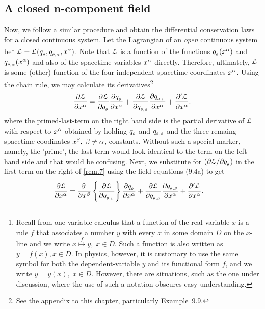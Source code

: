\subsection{A closed n-component field}
Now, we follow a similar procedure and obtain the 
  differential conservation laws for a closed continuous 
  system. Let the Lagrangian of an \textsl{open} 
continuous system  be\footnote{Recall from one-variable 
calculus that a function of the real variable $x$ is a rule 
$f$ that associates a number $y$ with every $x$ in some 
domain $D$ on the $x$-line and we write  
$x\overset{f}{\mapsto}y,\; x\in D$. Such a function is also 
written as $y=f(x),  x\in D$. In physics, however, it is 
customary to use the same symbol for both the 
dependent-variable $y$ and its functional form $f$, and we 
write $y=y(x), \; x\in D$. However, there are situations, 
such as the one under discussion, where the use of such a 
notation obscures easy understanding.} 
$\EuScript{L}=\EuScript{L}(q_{_{{\theta}}} ,q_{_{{\theta},{{\alpha}}}},x^{{\alpha}})$.   Note 
that $\EuScript{L}$ is a function of the functions 
$q_{_{{\theta}}} (x^{{\alpha}})$ and $q_{_{{\theta},{{\alpha}}}} (x^{{\alpha}})$ and also of the 
spacetime variables $x^{{\alpha}}$ directly. Therefore, 
ultimately, $\EuScript{L}$ is some   (other) function of 
the four independent spacetime   coordinates $x^{{\alpha}}$.  
Using the chain rule, we may calculate its 
derivatives\footnote{See the appendix to this chapter, 
particularly  Example~9.9.}
\begin{align}\label{rcm.7}
\frac{{\partial} \EuScript{L}} {{\partial} x^{{\alpha}}}
 =\frac{{\partial}\EuScript{L}}{{\partial} q_{_{{\theta}}} }
\frac{{\partial} q_{_{{\theta}}} }{{\partial} x^{{\alpha}}} +
\frac{{\partial}\EuScript{L}} {{\partial} q_{_{{\theta},{{\beta}}}}} \frac{{\partial} 
q_{_{{\theta},{{\beta}}}}}
{{\partial} x^{{\alpha}}}+\frac{{\partial}' \EuScript{L}}{{\partial}
x^{{\alpha}}}.
\end{align}
where the primed-last-term on the right hand side is the 
partial derivative of $\EuScript{L}$ with respect to 
$x^{{\alpha}}$ obtained by  holding $q_{_{{\theta}}} $ and $q_{_{{\theta},{{\beta}}}}$ and 
the three remaing spacetime  coodinates $x^{{\beta}}, 
\;{\beta}\neq{\alpha}$, constants. Without such a  special 
marker, namely, the  'prime', the last term would look 
identical to the term on the left hand side and that would 
be confusing. Next, we substitute for  $({\partial} \EuScript{L} 
/ 
{\partial} q_{_{{\theta}}}  )$ in the first term on the right of \eqref{rcm.7}
using the field equations (9.4a) to get
\begin{align*}
\frac{{\partial} \EuScript{L}}{{\partial} x^{{\alpha}}} & =\frac{{\partial}\;}
{{\partial} x^{{\beta}}} \left\{\frac{{\partial} \EuScript{L}}
{{\partial} q_{_{{\theta},{{\beta}}}}} \right\}
\frac{{\partial} q_{_{{\theta}}}  }{{\partial} x^{{\alpha}}}+
\frac{{\partial} \EuScript{L}}{{\partial} q_{_{{\theta},{{\beta}}}}}
\frac{{\partial} q_{_{{\theta},{{\beta}}}}}{{\partial} x^{{\alpha}}}+\frac{{\partial}'
\EuScript{L}}{{\partial} x^{{\alpha}}}.
\end{align*}
